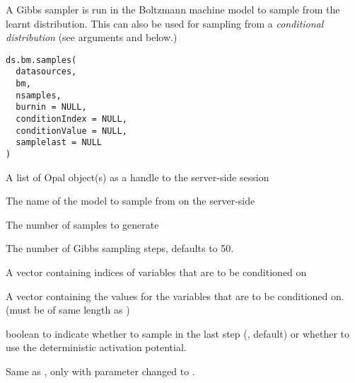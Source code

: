 %
\begin{Description}\relax
A Gibbs sampler is run in the Boltzmann machine model to sample from the learnt
distribution. This can also be used for sampling from a
\emph{conditional distribution}
(see arguments  and  below.)
\end{Description}
%
\begin{Usage}
\begin{verbatim}
ds.bm.samples(
  datasources,
  bm,
  nsamples,
  burnin = NULL,
  conditionIndex = NULL,
  conditionValue = NULL,
  samplelast = NULL
)
\end{verbatim}
\end{Usage}
%
\begin{Arguments}
\begin{ldescription}
\item[\code{datasources}] A list of Opal object(s) as a handle to the server-side session

\item[\code{bm}] The name of the model to sample from on the server-side

\item[\code{nsamples}] The number of samples to generate

\item[\code{burnin}] The number of Gibbs sampling steps, defaults to 50.

\item[\code{conditionIndex}] A vector containing indices of variables that are to be conditioned on

\item[\code{conditionValue}] A vector containing the values for the variables that are to be conditioned on.
(must be of same length as )

\item[\code{samplelast}] boolean to indicate whether to sample in the last step (, default)
or whether to use the deterministic activation potential.
\end{ldescription}
\end{Arguments}
%
\begin{Description}\relax
Same as , only with parameter  changed to .
\end{Description}
